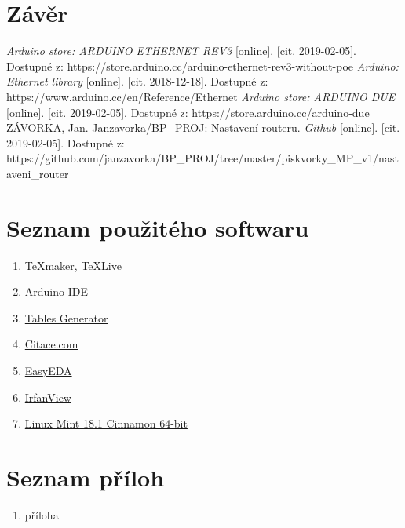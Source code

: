 \documentclass[a4paper,12pt, twoside]{article} %
\begin{document}
\section{Závěr}
%
\clearpage
\renewcommand{\refname}{Seznam použité literatury a zdrojů informací}
\begin{thebibliography}{99}
\textit{Arduino store: ARDUINO ETHERNET REV3} [online]. [cit. 2019-02-05]. Dostupné z: https://store.arduino.cc/arduino-ethernet-rev3-without-poe
\textit{Arduino: Ethernet library} [online]. [cit. 2018-12-18]. Dostupné z: https://www.arduino.cc/en/Reference/Ethernet
\textit{Arduino store: ARDUINO DUE} [online]. [cit. 2019-02-05]. Dostupné z: https://store.arduino.cc/arduino-due
ZÁVORKA, Jan. Janzavorka/BP\_PROJ: Nastavení routeru. \textit{Github} [online]. [cit. 2019-02-05]. Dostupné z: https://github.com/janzavorka/BP\_PROJ/tree/master/piskvorky\_MP\_v1/nastaveni\_router
\end{thebibliography}
\clearpage
{} %
\section*{Seznam použitého softwaru}
\begin{enumerate}%
	\item \TeX maker, \TeX Live
	\item \href{https://www.arduino.cc/en/main/software}{Arduino IDE}
	\item \href{https://www.tablesgenerator.com/latex_tables}{Tables Generator}
	\item \href{https://www.citace.com/citace-pro}{Citace.com}
	\item \href{https://easyeda.com/}{EasyEDA}
	\item \href{https://www.irfanview.com/}{IrfanView}
	\item \href{https://linuxmint.com/}{Linux Mint 18.1 Cinnamon 64-bit}
\end{enumerate}
\section*{Seznam příloh} 
\begin{enumerate}[{Příloha} 1:]
\item příloha
\end{enumerate}
\end{document}
